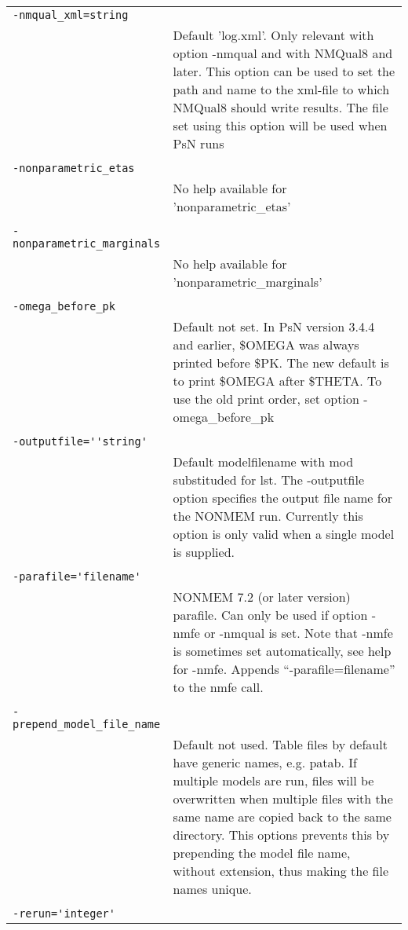 \documentclass[a4paper,12pt]{article}
\begin{document}
\begin{longtable}{p{1in}p{4in}}
\\
\verb|-nmqual_xml=string| & \\
\nopagebreak
 & Default 'log.xml'. Only relevant with option -nmqual and with NMQual8 and later. This option can be used to set the path and name to the xml-file to which NMQual8 should write results. The file set using  this option will be used when PsN runs  \\
\\
\verb|-nonparametric_etas| & \\
\nopagebreak
 & No help available for 'nonparametric\_etas' \\
\\
\verb|-nonparametric_marginals| & \\
\nopagebreak
 & No help available for 'nonparametric\_marginals' \\
\\
\verb|-omega_before_pk| & \\
\nopagebreak
 & Default not set. In PsN version 3.4.4 and earlier, \$OMEGA was always printed before \$PK. The new default is to print \$OMEGA after \$THETA. To use the old print order, set option -omega\_before\_pk \\
\\
\verb|-outputfile=''string'| & \\
\nopagebreak
 & Default modelfilename with mod substituded for lst. The -outputfile option specifies the output file name for the NONMEM run. Currently this option is only valid when a single model is supplied. \\
\\
\verb|-parafile='filename'| & \\
\nopagebreak
 & NONMEM 7.2 (or later version) parafile. Can only be used if option -nmfe or -nmqual is set. Note that -nmfe is sometimes set automatically, see help for -nmfe. Appends “-parafile=filename” to the nmfe call. \\
\\
\verb|-prepend_model_file_name| & \\
\nopagebreak
 & Default not used. Table files by default have generic names, e.g. patab. If multiple models are run, files will be overwritten when multiple files with the same name are copied back to the same directory. This options prevents this by prepending the model file name, without extension, thus making the file names unique. \\
\\
\verb|-rerun='integer'| & \\

\end{longtable}
\end{document}
